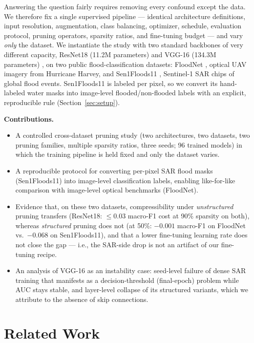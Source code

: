 \documentclass[conference]{IEEEtran}
\begin{document}
Answering the question fairly requires removing every confound except
the data. We therefore fix a single supervised pipeline --- identical
architecture definitions, input resolution, augmentation, class
balancing, optimizer, schedule, evaluation protocol, pruning
operators, sparsity ratios, and fine-tuning budget --- and vary
\emph{only} the dataset. We instantiate the study with two standard
backbones of very different capacity, ResNet18 (11.2M parameters)
\cite{he2016resnet} and VGG-16 (134.3M parameters)
\cite{simonyan2015vgg}, on two public flood-classification datasets:
FloodNet \cite{rahnemoonfar2021floodnet}, optical UAV imagery from
Hurricane Harvey, and Sen1Floods11 \cite{bonafilia2020sen1floods11},
Sentinel-1 SAR chips of global flood events. Sen1Floods11 is labeled
per pixel, so we convert its hand-labeled water masks into image-level
flooded/non-flooded labels with an explicit, reproducible rule
(Section~\ref{sec:setup}).

\noindent\textbf{Contributions.}
\begin{itemize}
\item A controlled cross-dataset pruning study (two architectures, two
datasets, two pruning families, multiple sparsity ratios, three seeds;
96 trained models) in which the training pipeline is held fixed and
only the dataset varies.
\item A reproducible protocol for converting per-pixel SAR flood masks
(Sen1Floods11) into image-level classification labels, enabling
like-for-like comparison with image-level optical benchmarks
(FloodNet).
\item Evidence that, on these two datasets, compressibility under
\emph{unstructured} pruning transfers (ResNet18: $\leq 0.03$ macro-F1
cost at 90\% sparsity on both), whereas \emph{structured} pruning does
not (at 50\%: $-0.001$ macro-F1 on FloodNet vs.\ $-0.068$ on
Sen1Floods11), and that a lower fine-tuning learning rate does not
close the gap --- i.e., the SAR-side drop is not an artifact of our
fine-tuning recipe.
\item An analysis of VGG-16 as an instability case: seed-level failure
of dense SAR training that manifests as a decision-threshold
(final-epoch) problem while AUC stays stable, and layer-level collapse
of its structured variants, which we attribute to the absence of skip
connections.
\end{itemize}

\section{Related Work}
\end{document}
